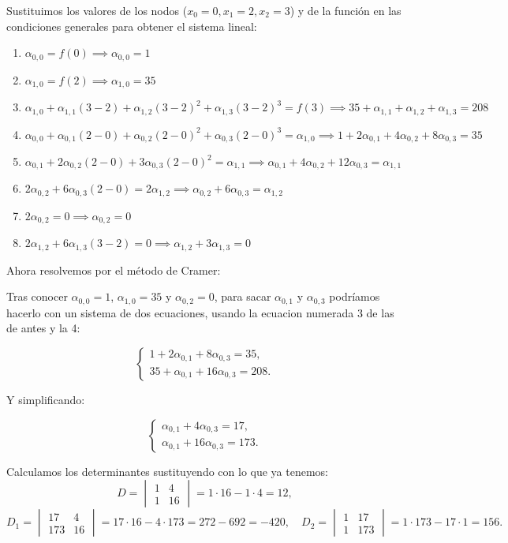 \documentclass{article}
\begin{document}
Sustituimos los valores de los nodos (\(x_0=0, x_1=2, x_2=3\)) y de la función en las condiciones generales para obtener el sistema lineal:
\begin{enumerate}
    \item \(\alpha_{0,0} = f(0) \implies \alpha_{0,0} = 1\)
    \item \(\alpha_{1,0} = f(2) \implies \alpha_{1,0} = 35\)
    \item \(\alpha_{1,0} + \alpha_{1,1}(3-2) + \alpha_{1,2}(3-2)^2 + \alpha_{1,3}(3-2)^3 = f(3)
          \implies 35 + \alpha_{1,1} + \alpha_{1,2} + \alpha_{1,3} = 208\)
    \item \(\alpha_{0,0} + \alpha_{0,1}(2-0) + \alpha_{0,2}(2-0)^2 + \alpha_{0,3}(2-0)^3 = \alpha_{1,0}
          \implies 1 + 2\alpha_{0,1} + 4\alpha_{0,2} + 8\alpha_{0,3} = 35\)
    \item \(\alpha_{0,1} + 2\alpha_{0,2}(2-0) + 3\alpha_{0,3}(2-0)^2 = \alpha_{1,1}
          \implies \alpha_{0,1} + 4\alpha_{0,2} + 12\alpha_{0,3} = \alpha_{1,1}\)
    \item \(2\alpha_{0,2} + 6\alpha_{0,3}(2-0) = 2\alpha_{1,2}
          \implies \alpha_{0,2} + 6\alpha_{0,3} = \alpha_{1,2}\)
    \item \(2\alpha_{0,2} = 0 \implies \alpha_{0,2} = 0\)
    \item \(2\alpha_{1,2} + 6\alpha_{1,3}(3-2) = 0 \implies \alpha_{1,2} + 3\alpha_{1,3} = 0\)
\end{enumerate}

Ahora resolvemos por el método de Cramer:

Tras conocer \(\alpha_{0,0}=1\), \(\alpha_{1,0}=35\) y \(\alpha_{0,2}=0\), para sacar \(\alpha_{0,1}\) y \(\alpha_{0,3}\) podríamos hacerlo con un sistema de dos ecuaciones, usando la ecuacion numerada 3 de las de antes y la  4:

$$
\begin{cases}
1 + 2\alpha_{0,1} + 8\alpha_{0,3} = 35,\\
35 + \alpha_{0,1} + 16\alpha_{0,3} = 208.
\end{cases}
$$

Y simplificando:

$$
\begin{cases}
\alpha_{0,1} + 4\alpha_{0,3} = 17, \\
\alpha_{0,1} + 16\alpha_{0,3} = 173.
\end{cases}
$$

Calculamos los determinantes sustituyendo con lo que ya tenemos:
$$
D = \begin{vmatrix}
1 & 4 \\
1 & 16
\end{vmatrix}
= 1\cdot16 - 1\cdot4 = 12,
$$
$$
D_{1} = \begin{vmatrix}
17 & 4 \\
173 & 16
\end{vmatrix}
= 17\cdot16 - 4\cdot173 = 272 - 692 = -420,
\quad
D_{2} = \begin{vmatrix}
1 & 17 \\
1 & 173
\end{vmatrix}
= 1\cdot173 - 17\cdot1 = 156.
$$
\end{document}
